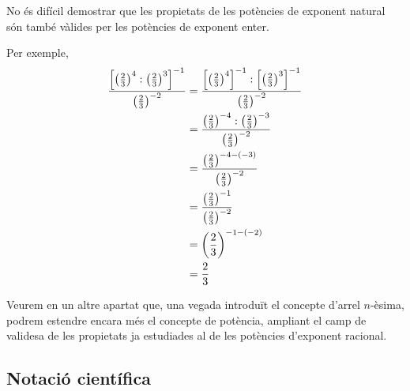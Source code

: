 No és difícil demostrar que les propietats de les potències de
exponent natural són també vàlides per les potències de
exponent enter.

Per exemple,%
\begin{align*}
\frac{\left[ \left( \frac{2}{3}\right) ^{4}:\left( \frac{2}{3}\right) ^{3}%
\right] ^{-1}}{\left( \frac{2}{3}\right) ^{-2}} &=\frac{\left[ \left( \frac{%
2}{3}\right) ^{4}\right] ^{-1}:\left[ \left( \frac{2}{3}\right) ^{3}\right]
^{-1}}{\left( \frac{2}{3}\right) ^{-2}} \\
&=\frac{\left( \frac{2}{3}\right) ^{-4}:\left( \frac{2}{3}\right) ^{-3}}{%
\left( \frac{2}{3}\right) ^{-2}} \\
&=\frac{\left( \frac{2}{3}\right) ^{-4-(-3)}}{\left( \frac{2}{3}\right)
^{-2}} \\
&=\frac{\left( \frac{2}{3}\right) ^{-1}}{\left( \frac{2}{3}\right) ^{-2}} \\
&=\left( \frac{2}{3}\right) ^{-1-(-2)} \\
&=\frac{2}{3}
\end{align*}

Veurem en un altre apartat que, una vegada introduït el concepte d’arrel $%
n $-èsima, podrem estendre encara més el concepte de potència,
ampliant el camp de validesa de les propietats ja estudiades al de les
potències d’exponent racional.

\subsection{Notació científica}

